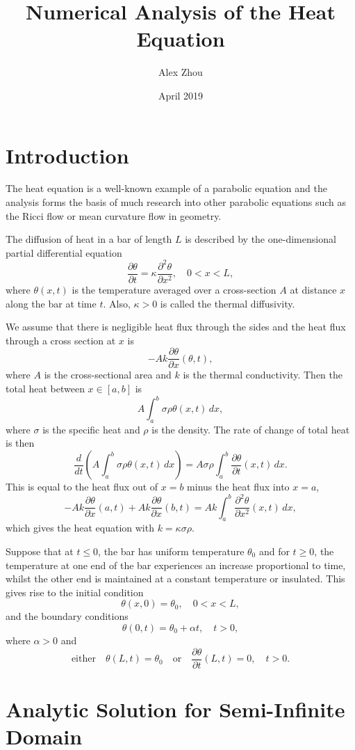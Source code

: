 \documentclass{article}
\title{Numerical Analysis of the Heat Equation}
\author{Alex Zhou}
\date{April 2019}
\newcommand{\pder}[2][]{\frac{\partial#1}{\partial#2}}
\newcommand{\spder}[2][]{\frac{\partial^2#1}{\partial#2^2}}
\begin{document}
\maketitle

\section{Introduction}

The heat equation is a well-known example of a parabolic equation and the analysis forms the basis of much research into other parabolic equations such as the Ricci flow or mean curvature flow in geometry.

The diffusion of heat in a bar of length \(L\) is described by the one-dimensional partial differential equation
\[ \pder[\theta]{t} = \kappa \spder[\theta]{x}, \quad 0 < x < L, \]
where \(\theta(x,t)\) is the temperature averaged over a cross-section \(A\) at distance \(x\) along the bar at time \(t\). Also, \(\kappa > 0\) is called the thermal diffusivity. 

We assume that there is negligible heat flux through the sides and the heat flux through a cross section at \(x\) is 
\[ -Ak \pder[\theta]{x}(\theta, t), \]
where \(A\) is the cross-sectional area and \(k\) is the thermal conductivity. Then the total heat between \(x \in [a, b]\) is 
\[ A\int_a^b \sigma\rho\theta(x,t)\,dx, \]
where \(\sigma\) is the specific heat and \(\rho\) is the density. The rate of change of total heat is then
\[ \frac{d}{dt}\left( A\int_a^b \sigma\rho\theta(x,t)\,dx \right) = A\sigma\rho\int_a^b \pder[\theta]{t}(x,t)\,dx. \]
This is equal to the heat flux out of \(x = b\) minus the heat flux into \(x = a\),
\[ -Ak\pder[\theta]{x}(a, t) + Ak\pder[\theta]{x}(b,t) = Ak\int_a^b \spder[\theta]{x}(x,t)\,dx, \]
which gives the heat equation with \(k = \kappa\sigma\rho\).

Suppose that at \(t \leq 0\), the bar has uniform temperature \(\theta_0\) and for \(t \geq 0\), the temperature at one end of the bar experiences an increase proportional to time, whilst the other end is maintained at a constant temperature or insulated. This gives rise to the initial condition
\[ \theta(x, 0) = \theta_0, \quad 0 < x < L, \]
and the boundary conditions
\[ \theta(0,t) = \theta_0 + \alpha t, \quad t > 0, \]
where \(\alpha > 0\) and 
\[ \mbox{either} \quad \theta(L, t) = \theta_0 \quad \mbox{or} \quad \pder[\theta]{t}(L,t) = 0, \quad t > 0. \]
\section{Analytic Solution for Semi-Infinite Domain}
\end{document}
